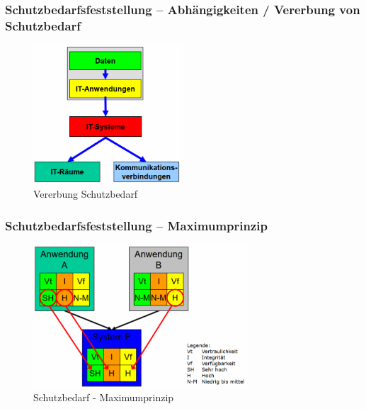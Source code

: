 \documentclass[10pt,a4paper]{article}
\begin{document}
\subsubsection*{Schutzbedarfsfeststellung – Abhängigkeiten / Vererbung von Schutzbedarf}
\begin{figure}[H]
    \begin{center}
    \includegraphics[width=5.5cm]{images/Vererbung Schutzbedarf.png}
    \caption{Vererbung Schutzbedarf}
    \label{Vererbung Schutzbedarf}
    \end{center}
\end{figure}

\subsubsection*{Schutzbedarfsfeststellung – Maximumprinzip}
\begin{figure}[H]
    \begin{center}
    \includegraphics[width=8cm]{images/Schutzbedarf - Maximumprinzip.png}
    \caption{Schutzbedarf - Maximumprinzip}
    \label{Schutzbedarf - Maximumprinzip}
    \end{center}
\end{figure}
\end{document}
